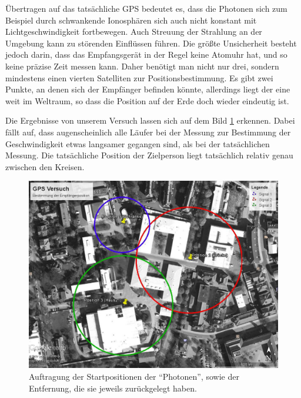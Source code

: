 \documentclass[12pt,a4paper,titlepage,headinclude,bibtotoc]{scrartcl}
\begin{document}
Übertragen auf das tatsächliche GPS bedeutet es, dass die Photonen sich zum Beispiel durch schwankende Ionosphären sich auch nicht konstant mit Lichtgeschwindigkeit fortbewegen.
Auch Streuung der Strahlung an der Umgebung kann zu störenden Einflüssen führen.
Die größte Unsicherheit besteht jedoch darin, dass das Empfangsgerät in der Regel keine Atomuhr hat, und so keine präzise Zeit messen kann.
Daher benötigt man nicht nur drei, sondern mindestens einen vierten Satelliten zur Positionsbestimmung.
Es gibt zwei Punkte, an denen sich der Empfänger befinden könnte, allerdings liegt der eine weit im Weltraum, so dass die Position auf der Erde doch wieder eindeutig ist.

Die Ergebnisse von unserem Versuch lassen sich auf dem Bild \ref{fig:gps} erkennen.
Dabei fällt auf, dass augenscheinlich alle Läufer bei der Messung zur Bestimmung der Geschwindigkeit etwas langsamer gegangen sind, als bei der tatsächlichen Messung.
Die tatsächliche Position der Zielperson liegt tatsächlich relativ genau zwischen den Kreisen.

\begin{figure}[h]
	\centering
	\includegraphics[scale=0.5]{GPS}
	\caption{Auftragung der Startpositionen der "`Photonen"', sowie der Entfernung, die sie jeweils zurückgelegt haben.}
	\label{fig:gps}
\end{figure}
\end{document}
